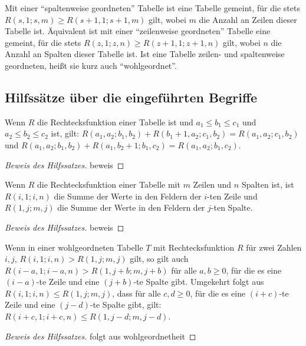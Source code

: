 \begin{definition}
    Mit einer "`spaltenweise geordneten"' Tabelle ist eine Tabelle gemeint, für die stets $R(s, 1; s, m)\geq 
    R(s+1, 1; s+1, m)$ gilt, wobei $m$ die Anzahl an Zeilen dieser Tabelle ist. Äquivalent ist mit einer 
    "`zeilenweise geordneten"' Tabelle eine gemeint, für die stets $R(z, 1; z, n)\geq R(z+1, 1; z+1, n)$ gilt, 
    wobei $n$ die Anzahl an Spalten dieser Tabelle ist. Ist eine Tabelle zeilen- und spaltenweise geordneten, heißt 
    sie kurz auch "`wohlgeordnet"'.
\end{definition}

\subsection*{Hilfssätze über die eingeführten Begriffe}

\renewcommand{\qedsymbol}{$\square$}

\begin{lem}\label{r_summe}
    Wenn $R$ die Rechtecksfunktion einer Tabelle ist und $a_1\leq b_1\leq c_1$ und $a_2\leq b_2\leq c_2$ ist, gilt: 
    $R(a_1, a_2; b_1, b_2)+R(b_1+1, a_2; c_1, b_2)=R(a_1, a_2; c_1, b_2)$ und 
    $R(a_1, a_2; b_1, b_2)+R(a_1, b_2+1; b_1, c_2)=R(a_1, a_2; b_1, c_2)$.
\end{lem}
\begin{proof}[Beweis des Hilfssatzes]
    beweis
\end{proof}
\begin{lem}\label{r_zeile_spalte}
    Wenn $R$ die Rechtecksfunktion einer Tabelle mit $m$ Zeilen und $n$ Spalten ist, ist $R(i, 1; i, n)$ die Summe 
    der Werte in den Feldern der $i$-ten Zeile und $R(1, j; m, j)$ die Summe der Werte in den Feldern der $j$-ten 
    Spalte.
\end{lem}
\begin{proof}[Beweis des Hilfssatzes]
    beweis
\end{proof}
\begin{lem}\label{mehr_nuller}
    Wenn in einer wohlgeordneten Tabelle $T$ mit Rechtecksfunktion $R$ für zwei Zahlen $i, j$, $R(i, 1; i, n)>
    R(1, j; m, j)$ gilt, so gilt auch $R(i-a, 1; i-a, n)>R(1, j+b; m, j+b)$ für alle $a, b\geq0$, für die es eine 
    $(i-a)$-te Zeile und eine $(j+b)$-te Spalte gibt. Umgekehrt folgt aus $R(i, 1; i, n)\leq R(1, j; m, j)$, dass für 
    alle $c,d\geq0$, für die es eine $(i+c)$-te Zeile und  eine $(j-d)$-te Spalte gibt, gilt: $R(i+c, 1; i+c, n)\leq 
    R(1, j-d; m, j-d)$. 
\end{lem}
\begin{proof}[Beweis des Hilfssatzes]
    folgt aus wohlgeordnetheit %
\end{proof}

